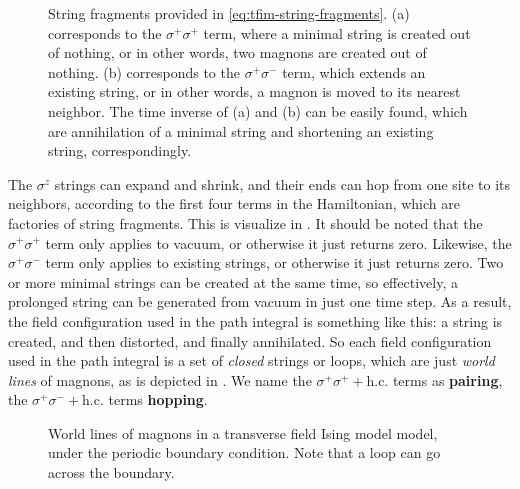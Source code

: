 \documentclass[hyperref, a4paper]{article}
\newcommand*{\concept}[1]{{\textbf{#1}}}
\newcommand*{\tfim}{transverse field Ising model }
\begin{document}
\begin{figure}
    \centering
    \begin{subfigure}{0.48\textwidth}
        
        \subcaption{}
    \end{subfigure}
    \begin{subfigure}{0.48\textwidth}
        
        \subcaption{}
    \end{subfigure}
    \caption{String fragments provided in \eqref{eq:tfim-string-fragments}. 
    (a) corresponds to the $\sigma^+ \sigma^+$ term, where a minimal string is created out of nothing, 
    or in other words, two magnons are created out of nothing.
    (b) corresponds to the $\sigma^+ \sigma^-$ term, which extends an existing string, 
    or in other words, a magnon is moved to its nearest neighbor. 
    The time inverse of (a) and (b) can be easily found, which are annihilation of a minimal string and shortening an existing string, correspondingly.}
    \label{fig:tfim-string-fragments}
\end{figure}

The $\sigma^z$ strings can expand and shrink, and their ends can hop from one site to its neighbors, 
according to the first four terms in the Hamiltonian, which are factories of string fragments.
This is visualize in .
It should be noted that the $\sigma^+ \sigma^+$ term only applies to vacuum, or otherwise it just returns zero.
Likewise, the $\sigma^+ \sigma^-$ term only applies to existing strings, or otherwise it just returns zero.
Two or more minimal strings can be created at the same time, 
so effectively, a prolonged string can be generated from vacuum in just one time step.
As a result, the field configuration used in the path integral is something like this: 
a string is created, and then distorted, and finally annihilated.
So each field configuration used in the path integral is a set of \emph{closed} strings or loops, 
which are just \emph{world lines} of magnons, as is depicted in .
We name the $\sigma^+ \sigma^+ + \text{h.c.}$ terms as \concept{pairing}, the $\sigma^+ \sigma^- + \text{h.c.}$ terms \concept{hopping}.

\begin{figure}
    \centering
    
    \caption{World lines of magnons in a \tfim model, under the periodic boundary condition. Note that a loop can go across the boundary.}
    \label{fig:tfim-worldline}
\end{figure}
\end{document}
